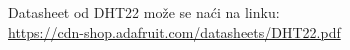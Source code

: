 \documentclass[a4paper, 12pt]{article}
\begin{document}
%
%
%
%
\begin{enumerate}[label={[\arabic*]}, leftmargin=2.5cm]
	\item Datasheet od DHT22 može se naći na linku: \label{ref:DHT22-datasheet}\\ \url{https://cdn-shop.adafruit.com/datasheets/DHT22.pdf}	
	
\end{enumerate}
\renewcommand{\theenumi}{\arabic{enumi}}

\pagebreak
\endgroup
\end{document}
